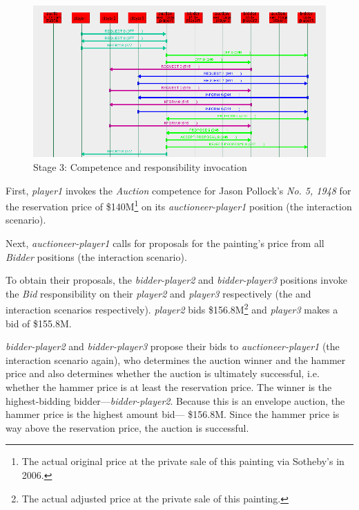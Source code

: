 \begin{figure}[H]
	\centering
	\includegraphics[width=\textwidth]{images/examples/example3-stage3a.png}
	\caption{Stage 3: Competence and responsibility invocation}
	\label{figure:example3-stage3a}
\end{figure}

First, \textit{player1} invokes the \textit{Auction} competence for Jason Pollock's \textit{No. 5, 1948} for the reservation price of \$140M\footnote{The actual original price at the private sale of this painting via Sotheby's in 2006.} on its \textit{auctioneer-player1} position (the {} interaction scenario).

Next, \textit{auctioneer-player1} calls for proposals for the painting's price from all \textit{Bidder} positions (the {} interaction scenario).

To obtain their proposals, the \textit{bidder-player2} and \textit{bidder-player3} positions invoke the \textit{Bid} responsibility on their \textit{player2} and \textit{player3} respectively (the {} and {} interaction scenarios respectively).
\textit{player2} bids \$156.8M\footnote{The actual adjusted price at the private sale of this painting.} and \textit{player3} makes a bid of \$155.8M.

\textit{bidder-player2} and \textit{bidder-player3} propose their bids to \textit{auctioneer-player1} (the {} interaction scenario again), who determines the auction winner and the hammer price and also determines whether the auction is ultimately successful, i.e. whether the hammer price is at least the reservation price.
The winner is the highest-bidding bidder---\textit{bidder-player2}.
Because this is an envelope auction, the hammer price is the highest amount bid--- \$156.8M.
Since the hammer price is way above the reservation price, the auction is successful.

